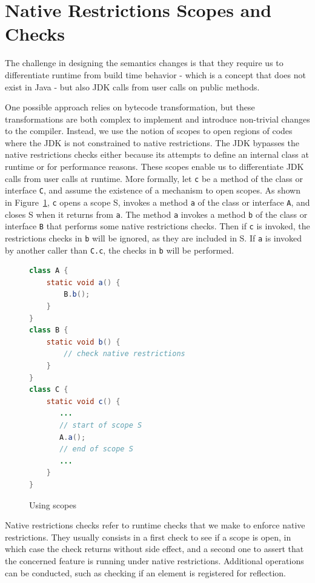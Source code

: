 \section{Native Restrictions Scopes and Checks}
The challenge in designing the semantics changes is that they require us to differentiate runtime from build time behavior - which is a concept that does not exist in Java - but also JDK calls from user calls on public methods.

One possible approach relies on bytecode transformation, but these transformations are both complex to implement and introduce non-trivial changes to the compiler. 
Instead, we use the notion of scopes to open regions of codes where the JDK is not constrained to native restrictions.
The JDK bypasses the native restrictions checks either because its attempts to define an internal class at runtime or for performance reasons.
These scopes enable us to differentiate JDK calls from user calls at runtime.
More formally, let \verb|c| be a method of the class or interface \verb|C|, and assume the existence of a mechanism to open scopes. As shown in Figure~\ref{fig:scopes}, \verb|c| opens a scope S, invokes a method \verb|a| of the class or interface \verb|A|, and closes S when it returns from \verb|a|.
The method \verb|a| invokes a method \verb|b| of the class or interface \verb|B| that performs some native restrictions checks.
Then if \verb|c| is invoked, the restrictions checks in \verb|b| will be ignored, as they are included in S.
If \verb|a| is invoked by another caller than \verb|C.c|, the checks in \verb|b| will be performed.

\begin{figure}[ht]
    \centering
\begin{lstlisting}[language=Java]
class A {
    static void a() {
        B.b(); 
    }
} 
class B {
    static void b() {
        // check native restrictions
    }
}
class C {
    static void c() {
       ...
       // start of scope S
       A.a();
       // end of scope S
       ...
    }
}
\end{lstlisting}
    \caption{Using scopes}
    \label{fig:scopes}
\end{figure}

Native restrictions checks refer to runtime checks that we make to enforce native restrictions. They usually consists in a first check to see if a scope is open, in which case the check returns without side effect, and a second one to assert that the concerned feature is running under native restrictions. Additional operations can be conducted, such as checking if an element is registered for reflection. 


